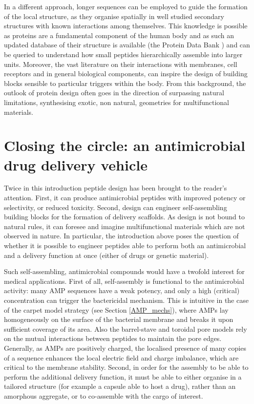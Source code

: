 In a different approach, longer sequences can be employed to guide the formation of the local structure, as they organise spatially in well studied secondary structures with known interactions among themselves.
%
This knowledge is possible as proteins are a fundamental component of the human body and as such an updated database of their structure is available (the Protein Data Bank \citep{PDB}) and can be queried to understand how small peptides hierarchically assemble into larger units.
%
Moreover, the vast literature on their interactions with membranes, cell receptors and in general biological components, can inspire the design of building blocks sensible to particular triggers within the body. From this background, the outlook of protein design often goes in the direction of surpassing natural limitations, synthesising exotic, non natural, geometries \citep{Yeates2019,Malay2019} for multifunctional materials.


\section{Closing the circle: an antimicrobial drug delivery vehicle}

Twice in this introduction peptide design has been brought to the reader's attention. First, it can produce antimicrobial peptides with improved potency or selectivity, or reduced toxicity. Second,  design can engineer self-assembling building blocks for the formation of delivery scaffolds. As design is not bound to natural rules, it can foresee and imagine multifunctional materials which are not observed in nature. In particular, the introduction above poses the question of whether it is possible to engineer peptides able to perform both an antimicrobial and a delivery function at once (either of drugs or genetic material).

Such self-assembling, antimicrobial compounds would have a twofold interest for medical applications.
%
First of all, self-assembly is functional to the antimicrobial activity: many AMP sequences have a weak potency, and only a high (critical) concentration can trigger the bactericidal mechanism. This is intuitive in the case of the carpet model strategy (see Section \ref{AMP_mechs}), where AMPs lay homogeneously on the surface of the bacterial membrane and breaks it upon sufficient coverage of its area. Also the barrel-stave and toroidal pore models rely on the mutual interactions between peptides to maintain the pore edges.
%
Generally, as AMPs are positively charged, the localised presence of many copies of a sequence enhances the local electric field and charge imbalance, which are critical to the membrane stability. 
%
Second, in order for the assembly to be able to perform the additional delivery function, it must be able to either organise in a tailored structure (for example a capsule able to host a drug), rather than an amorphous aggregate, or to co-assemble with the cargo of interest.

